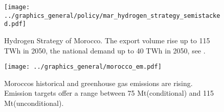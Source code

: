 \begin{figure}
    \centering
    \texttt{[image: ../graphics\_general/policy/mar\_hydrogen\_strategy\_semistacked.pdf]}
    \caption{Hydrogen Strategy of Morocco. The export volume rise up to 115 TWh in 2050, the national demand up to 40 TWh in 2050, see \cite{MarHyStrat2021}.}
    \label{fig:mar_hydrogen_strategy}
\end{figure}


\begin{figure}[h!]
    \centering
    \texttt{[image: ../graphics\_general/morocco\_em.pdf]}
    \caption{Moroccos historical \co and greenhouse gas emissions are rising. Emission targets offer a range between 75 Mt\coe (conditional) and 115 Mt\coe (unconditional).}
    \label{fig:morocco_em}
\end{figure}
